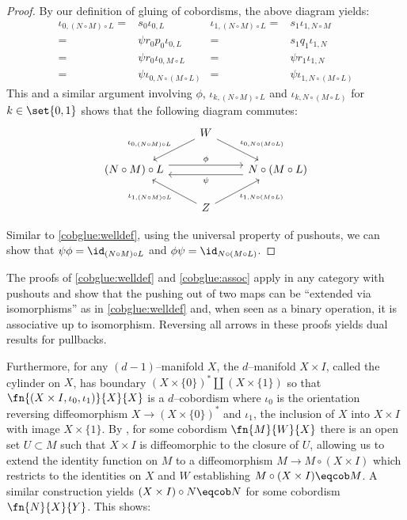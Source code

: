 \begin{proof}
By our definition of gluing of cobordisms, the above diagram yields:
\begin{align*}
  \iota_{0, (N \circ M) \circ L} =& s_0 \iota_{0, L}
    & \iota_{1, (N \circ M) \circ L} =& s_1 \iota_{1, N \circ M} \\
  =& \psi r_0 p_0 \iota_{0, L}
    & =& s_1 q_1 \iota_{1, N} \\
  =& \psi r_0 \iota_{0, M \circ L}
    & =& \psi r_1 \iota_{1, N} \\
  =& \psi \iota_{0, N \circ (M \circ L)}
    & =& \psi \iota_{1, N \circ (M \circ L)}
\end{align*}
This and a similar argument involving $\phi$, $\iota_{k, (N \circ M) \circ L}$
and $\iota_{k, N \circ (M \circ L)}$ for $k \in \set{0, 1}$ shows that the
following diagram commutes:
\[\begin{tikzcd}
  & W
      \arrow{ld}[left, yshift=5pt]{\iota_{0, (N \circ M) \circ L}}
      \arrow[rd, "\iota_{0, N \circ (M \circ L)}"] & \\
  (N \circ M) \circ L
      \arrow[rr, shift left=1ex, "\phi"]
  &
  & N \circ (M \circ L)
      \arrow[ll, shift left=1ex, "\psi"] \\
  & Z
      \arrow[lu, "\iota_{1, (N \circ M) \circ L}"]
      \arrow{ru}[right, yshift=-5pt]{\iota_{1, N \circ (M \circ L)}} &
\end{tikzcd}\]

Similar to \ref{cobglue:welldef}, using the universal property of pushouts, we
can show that $\psi\phi = \id_{(N \circ M) \circ L}$ and
$\phi\psi = \id_{N \circ (M \circ L)}$.
\end{proof}

\begin{rmk}
The proofs of \ref{cobglue:welldef} and \ref{cobglue:assoc} apply in any
category with pushouts and show that the pushing out of two maps can be
``extended via isomorphisms'' as in \ref{cobglue:welldef} and, when seen as a
binary operation, it is associative up to isomorphism. Reversing all arrows in
these proofs yields dual results for pullbacks.
\end{rmk}

Furthermore, for any $(d - 1)$--manifold $X$, the $d$--manifold $X \times I$,
called the cylinder on $X$, has boundary
$(X \times \{0\})^* \amalg (X \times \{1\})$ so that
$\fn{(X \times I, \iota_0, \iota_1)} {X}{X}$ is a $d$--cobordism where $\iota_0$
is the orientation reversing diffeomorphism $X \to (X \times \{0\})^*$ and
$\iota_1$, the inclusion of $X$ into $X \times I$ with image $X \times \{1\}$.
By \cite[339, Thm. 2]{collar}, for some cobordism $\fn{M}{W}{X}$ there is an
open set $U \subset M$ such that $X \times I$ is diffeomorphic to the closure of
$U$, allowing us to extend the identity function on $M$ to a diffeomorphism
$M \to M \circ (X \times I)$ which restricts to the identities on $X$ and $W$
establishing $M \circ (X \times I) \eqcob M$. A similar construction yields
$(X \times I) \circ N \eqcob N$ for some cobordism $\fn{N}{X}{Y}$. This shows:

